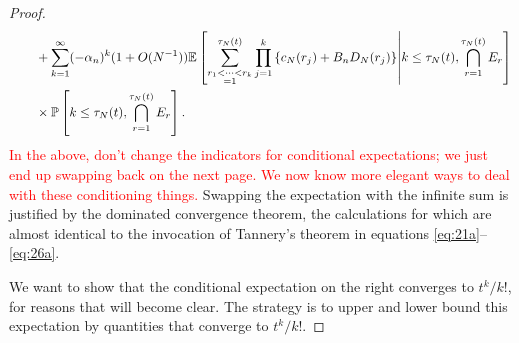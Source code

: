 \documentclass{article}
\newcommand{\seb}[1]{\xspace\textcolor{red}{#1}\xspace}
\newcommand{\Prob}{\mathbb{P}}
\newcommand{\E}{\mathbb{E}}
\newcommand{\1}[1]{\mathbbm{1}_{#1}}
\begin{document}
\begin{proof}
\begin{align}
&\qquad + \sum_{k=1}^{\infty} (- \alpha_n)^k (1+O(N^{-1}))
\E \left[ \sum_{\substack{r_1<\dots<r_k \\ =1}}^{\tau_N(t)}\prod_{j=1}^k 
\left\{ c_N(r_j) + B_n D_N(r_j) \right\} \middle| k\leq\tau_N(t), \bigcap_{r=1}^{\tau_N(t)} E_r \right] \notag\\
&\qquad \times \Prob \left[ k\leq \tau_N(t), \bigcap_{r=1}^{\tau_N(t)} E_r \right] .
\end{align}
\seb{In the above, don't change the indicators for conditional expectations; we just end up swapping back on the next page. We now know more elegant ways to deal with these conditioning things.}
Swapping the expectation with the infinite sum is justified by the dominated convergence theorem, the calculations for which are almost identical to the invocation of Tannery's theorem in equations 
\eqref{eq:21a}--\eqref{eq:26a}.

We want to show that the conditional expectation on the right converges to $t^k/k!$, for reasons that will become clear. The strategy is to upper and lower bound this expectation by quantities that converge to $t^k/k!$. 


\end{proof}
\end{document}

